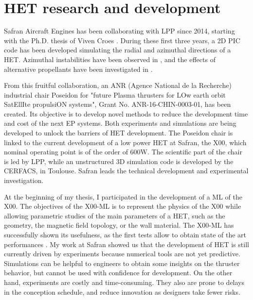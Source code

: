 

\section{\acs{HET} research and development}
\label{sec-poseidon}

Safran Aircraft Engines has been collaborating with \ac{LPP} since 2014, starting with the Ph.D. thesis of Viven Croes \citep{croes2017}.
During these first three years, a \ac{2D} \ac{PIC} code has been developed simulating the radial and azimuthal directions of a \ac{HET}.
Azimuthal instabilities have been observed in \citet{croes2017a}, and the effects of alternative propellants have been investigated in \citet{croes2018}.

From this fruitful collaboration, an ANR (Agence National de la Recherche) industrial chair {\sc Poseidon} for  "future Plasma thrusters for LOw earth orbit SatEllIte propulsiON systems", Grant No. ANR-16-CHIN-0003-01, has been created.
Its objective is to develop novel methods to reduce the development time and cost of the next \ac{EP} systems.
Both experiments and simulations are being developed to unlock the barriers of \ac{HET} development.
The {\sc Poseidon} chair is linked to the current development of a  low power \ac{HET} at Safran, the \PPS X00, which nominal operating point is of the order of 600W.
The scientific part of the chair is led by \ac{LPP}, while an unstructured \ac{3D} simulation code is developed by the CERFACS, in Toulouse.
Safran leads the technical development and experimental investigation.

At the beginning of my thesis, I participated in the development of a \ac{ML} of the \PPS X00.
The objectives of the \PPS X00-\ac{ML}  is to represent the physics of the \PPS X00 while allowing parametric studies of the main parameters of a \ac{HET}, such as the geometry, the magnetic field topology, or the wall material.
The \PPS X00-\ac{ML} has successfully shown its usefulness, as the first tests allow to obtain state of the art performances \citep{vaudolon2018}.
My work at Safran showed us that the development of \ac{HET} is still currently driven by experiments because numerical tools are not yet predictive.
Simulations can be helpful to engineers to obtain some insights on the thruster behavior, but cannot be used with confidence for development.
On the other hand, experiments are costly and time-consuming.
They also are prone to delays in the conception schedule, and reduce innovation as designers take fewer risks.

